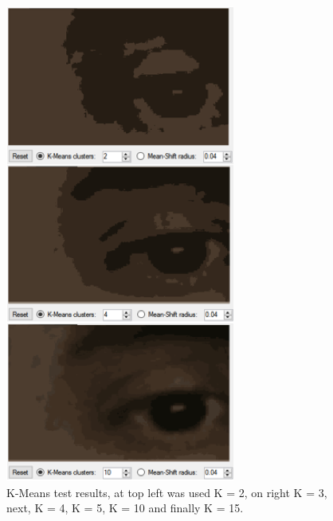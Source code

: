 \documentclass[10pt, conference]{IEEEtran}
\begin{document}
\begin{figure}[t]
	\centering
	\includegraphics{figures/pic14.png}
    \caption{K-Means test results, at top left was used K = 2, on right K = 3, next, K = 4, K = 5, K = 10 and finally K = 15.}
    \label{fig:fig14}
\end{figure}

\cite{Sibgrapi2016}



\end{document}

